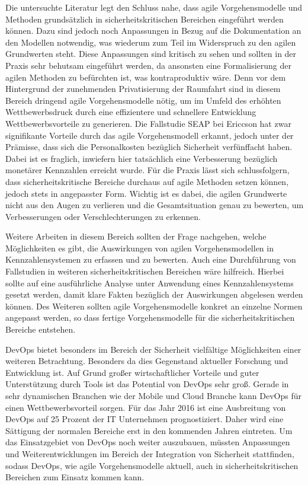 Die untersuchte Literatur legt den Schluss nahe, dass agile Vorgehensmodelle und Methoden grundsätzlich in sicherheitskritischen Bereichen eingeführt werden können.
Dazu sind jedoch noch Anpassungen in Bezug auf die Dokumentation an den Modellen notwendig, was wiederum zum Teil im Widerspruch zu den agilen Grundwerten steht.
Diese Anpassungen sind kritisch zu sehen und sollten in der Praxis sehr behutsam eingeführt werden, da ansonsten eine Formalisierung der agilen Methoden zu befürchten ist, was kontraproduktiv wäre.
Denn vor dem Hintergrund der zunehmenden Privatisierung der Raumfahrt sind in diesem Bereich dringend agile Vorgehensmodelle nötig, um im Umfeld des erhöhten Wettbewerbsdruck durch eine effizientere und schnellere Entwicklung Wettbewerbsvorteile zu generieren.
Die Fallstudie SEAP bei Ericcson hat zwar signifikante Vorteile durch das agile Vorgehensmodell erkannt, jedoch unter der Prämisse, dass sich die Personalkosten bezüglich Sicherheit verfünffacht haben.
Dabei ist es fraglich, inwiefern hier tatsächlich eine Verbesserung bezüglich monetärer Kennzahlen erreicht wurde.
Für die Praxis lässt sich schlussfolgern, dass sicherheitskritische Bereiche durchaus auf agile Methoden setzen können, jedoch stets in angepasster Form.
Wichtig ist es dabei, die agilen Grundwerte nicht aus den Augen zu verlieren und die Gesamtsituation genau zu bewerten, um Verbesserungen oder Verschlechterungen zu erkennen.

Weitere Arbeiten in diesem Bereich sollten der Frage nachgehen, welche Möglichkeiten es gibt, die Auswirkungen von agilen Vorgehensmodellen in Kennzahlensystemen zu erfassen und zu bewerten.
Auch eine Durchführung von Fallstudien in weiteren sicherheitskritischen Bereichen wäre hilfreich. 
Hierbei sollte auf eine ausführliche Analyse unter Anwendung eines Kennzahlensystems gesetzt werden, damit klare Fakten bezüglich der Auswirkungen abgelesen werden können.
Des Weiteren sollten agile Vorgehensmodelle konkret an einzelne Normen angepasst werden, so dass fertige Vorgehensmodelle für die sicherheitskritischen Bereiche entstehen.

DevOps bietet besonders im Bereich der Sicherheit vielfältige Möglichkeiten einer weiteren Betrachtung. Besonders da dies Gegenstand aktueller Forschung und Entwicklung ist. Auf Grund großer wirtschaftlicher Vorteile und guter Unterstützung durch Tools ist das Potential von DevOps sehr groß. Gerade in sehr dynamischen Branchen wie der Mobile und Cloud Branche kann DevOps für einen Wettbewerbsvorteil sorgen. Für das Jahr 2016 ist eine Ausbreitung von DevOps auf 25 Prozent der IT Unternehmen prognostiziert. Daher wird eine Sättigung der normalen Bereiche erst in den kommenden Jahren eintreten. Um das Einsatzgebiet von DevOps noch weiter auszubauen, müssten Anpassungen und Weiterentwicklungen im Bereich der Integration von Sicherheit stattfinden, sodass DevOps, wie agile Vorgehensmodelle aktuell, auch in sicherheitskritischen Bereichen zum Einsatz kommen kann.